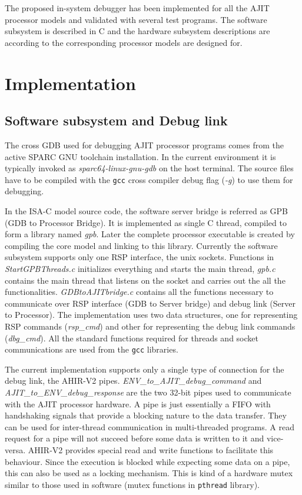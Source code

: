 
The proposed in-system debugger has been implemented for all the AJIT processor models and validated with several test programs. The software subsystem is described in C and the hardware subsystem descriptions are according to the corresponding processor models are designed for.

\section{Implementation}
\subsection{Software subsystem and Debug link}
The cross GDB used for debugging AJIT processor programs comes from the active SPARC GNU toolchain installation. In the current environment it is typically invoked as \textit{sparc64-linux-gnu-gdb} on the host terminal. The source files have to be compiled with the \texttt{gcc}\cite{gcc} cross compiler debug flag (\textit{-g}) to use them for debugging.

In the ISA-C model source code, the software server bridge is referred as GPB (GDB to Processor Bridge). It is implemented as single C thread, compiled to form a library named \textit{gpb}. Later the complete processor executable is created by compiling the core model and linking to this library. Currently the software subsystem supports only one RSP interface, the unix sockets. Functions in \textit{StartGPBThreads.c} initializes everything and starts the main thread,  \textit{gpb.c} contains the main thread that listens on the socket and carries out the all the functionalities. \textit{GDBtoAJITbridge.c} contains all the functions necessary to communicate over RSP interface (GDB to Server bridge) and debug link (Server to Processor). The implementation uses two data structures, one for representing RSP commands (\textit{rsp\_cmd}) and other for representing the debug link commands (\textit{dbg\_cmd}). All the standard functions required for threads and socket communications are used from the \texttt{gcc} libraries.

The current implementation supports only a single type of connection for the debug link, the AHIR-V2 \cite{AhirThesis} pipes. \textit{ENV\_to\_AJIT\_debug\_command} and \textit{AJIT\_to\_ENV\_debug\_response} are the two 32-bit pipes used to communicate with the AJIT processor hardware. A pipe is just essentially a FIFO with handshaking signals that provide a blocking nature to the data transfer\cite{sarath}. They can be used for inter-thread communication in multi-threaded programs. A read request for a pipe will not succeed before some data is written to it and vice-versa. AHIR-V2 provides special read and write functions to facilitate this behaviour. Since the execution is blocked while expecting some data on a pipe, this can also be used as a locking mechanism. This is kind of a hardware mutex similar to those used in software (mutex functions in \texttt{pthread} library).

